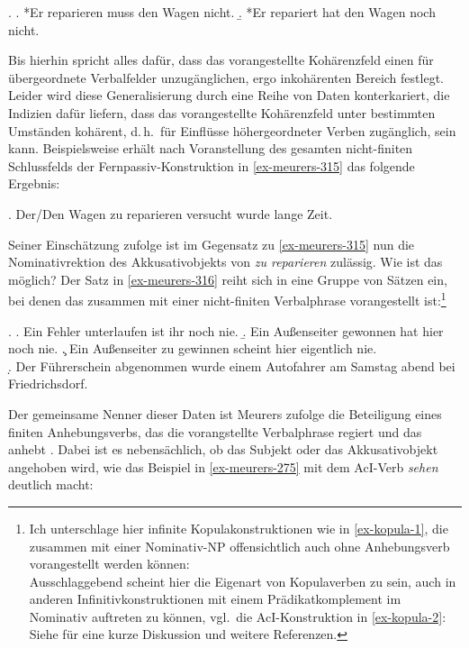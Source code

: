 \ex. \label{ex-voran-er}
\a. \label{ex-voran-er-a} *Er reparieren muss den Wagen nicht.
\b. \label{ex-voran-er-b} *Er repariert hat den Wagen noch nicht.

Bis hierhin spricht alles dafür, dass das vorangestellte Kohärenzfeld einen für übergeordnete Verbalfelder unzugänglichen, ergo inkohärenten Bereich festlegt. Leider wird diese Generalisierung durch eine Reihe von Daten konterkariert, die Indizien dafür liefern, dass das vorangestellte Kohärenzfeld unter bestimmten Umständen kohärent, d.\,h.\ für Einflüsse höhergeordneter Verben zugänglich, sein kann. Beispielsweise erhält \cite{Meurers:99} nach Voranstellung des gesamten nicht-finiten Schlussfelds der Fernpassiv-Konstruktion in \ref{ex-meurers-315} das folgende Ergebnis:

\ex. Der/Den Wagen zu reparieren versucht wurde lange Zeit.\\
\citep[(316b)]{Meurers:99}\label{ex-meurers-316} 

\largerpage%
Seiner Einschätzung zufolge ist im Gegensatz zu \ref{ex-meurers-315} nun die Nominativrektion des Akkusativobjekts von {\it zu reparieren} zulässig. Wie ist das möglich? Der Satz in \ref{ex-meurers-316} reiht sich in eine Gruppe von Sätzen ein, bei denen das  zusammen mit einer nicht-finiten Verbalphrase vorangestellt ist:\footnote{Ich unterschlage hier infinite Kopulakonstruktionen wie in \ref{ex-kopula-1}, die zusammen mit einer Nominativ-NP offensichtlich auch ohne Anhebungsverb vorangestellt werden können:\\
Ausschlaggebend scheint hier die Eigenart von Kopulaverben zu sein, auch in anderen Infinitivkonstruktionen mit einem Prädikatkomplement im Nominativ auftreten zu können, vgl.\ die AcI-Konstruktion in \ref{ex-kopula-2}:\\
Siehe \citet[314ff]{Meurers:99} für eine kurze Diskussion und weitere Referenzen.}
{
\ex. 
\a. Ein Fehler unterlaufen ist ihr noch nie. \hfill \citep[(10a)]{Haider:90}
\b. Ein Au\ss enseiter gewonnen hat hier noch nie.\hfill \citep[(10d)]{Haider:90}
\c. Ein Au\ss enseiter zu gewinnen scheint hier eigentlich nie.\\
\citep[(265)]{Meurers:99}\label{ex-meurers-265}
\d. Der Führerschein abgenommen wurde einem Autofahrer am Samstag abend bei Friedrichsdorf. \hfill \citep[(283)]{Meurers:99}

}
\noindent Der gemeinsame Nenner dieser Daten ist Meurers zufolge die Beteiligung eines finiten Anhebungsverbs, das die vorangstellte Verbalphrase regiert und das  anhebt \citep[289ff]{Meurers:99}. Dabei ist es nebensächlich, ob das Subjekt oder das Akkusativobjekt angehoben wird, wie das Beispiel in \ref{ex-meurers-275} mit dem AcI-Verb {\it sehen} deutlich macht:\largerpage%
  
